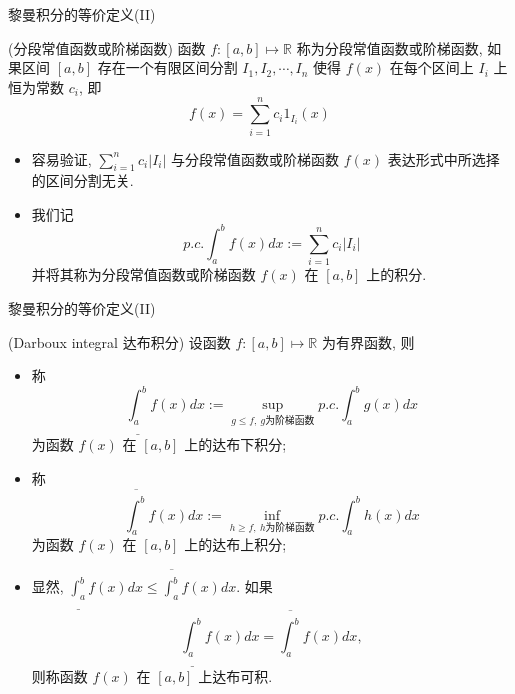 \begin{frame}{黎曼积分的等价定义(II)}
	\begin{defi} (分段常值函数或阶梯函数) 函数 $f:[a,b]\mapsto \mathbb{R}$ 称为分段常值函数或阶梯函数, 如果区间 $[a,b]$ 存在一个有限区间分割 $I_1, I_2,\cdots, I_n$ 使得 $f(x)$ 在每个区间上 $I_i$ 上恒为常数 $c_i$, 即
		\[f(x)=\sum_{i=1}^{n}c_i1_{I_i}(x)\]
	\end{defi}
	\pause
	\begin{rmk}
		\begin{itemize}[<+-|alert@+>]
			\item 容易验证, $\sum_{i=1}^nc_i|I_i|$ 与分段常值函数或阶梯函数 $f(x)$ 表达形式中所选择的区间分割无关.%
			\item 我们记
			\[p.c.\int_a^bf(x)dx:=\sum_{i=1}^nc_i|I_i|\]
			并将其称为分段常值函数或阶梯函数 $f(x)$ 在 $[a,b]$ 上的积分.
		\end{itemize}
	\end{rmk}
\end{frame}
\begin{frame}{黎曼积分的等价定义(II)}
	\begin{defi} ({\rm Darboux integral} 达布积分) 设函数 $f:[a,b]\mapsto \mathbb{R}$ 为有界函数, 则
		\begin{itemize}[<+-|alert@+>]
			\item 称\[\underline{\int_a^b}f(x)dx:=\sup_{g\leq f,\  g\mbox{为阶梯函数}}p.c.\int_a^bg(x)dx\]
			为函数 $f(x)$ 在 $[a,b]$ 上的达布下积分;%
			\item 称\[\overline{\int_a^b}f(x)dx:=\inf_{h\geq f,\  h\mbox{为阶梯函数}}p.c.\int_a^bh(x)dx\]
			为函数 $f(x)$ 在 $[a,b]$ 上的达布上积分;
			\item 显然, $\underline{\int_a^b}f(x)dx\leq \overline{\int_a^b}f(x)dx$. 如果
			\[\underline{\int_a^b}f(x)dx=\overline{\int_a^b}f(x)dx,\]
			则称函数 $f(x)$ 在 $[a,b]$ 上达布可积.
		\end{itemize}
	\end{defi}

\end{frame}

